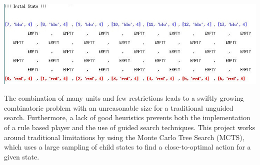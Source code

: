 \documentclass[landscape,final,a0paper,10pt]{baposter}
\begin{document}
\begin{poster}
{\vspace{0.3cm}

\includegraphics[width=0.9\colwidth]{../images/virtualboard_3.png}

\vspace{0.3cm}

The combination of many units and few restrictions leads to a swiftly growing combinatoric problem with an unreasonable size for a traditional unguided search.
Furthermore, a lack of good heuristics prevents both the implementation of a rule based player and the use of guided search techniques.
This project works around traditional limitations by using the Monte Carlo Tree Search (MCTS), which uses a large sampling of child states to find a close-to-optimal action for a given state.



}


\end{poster}
\end{document}
